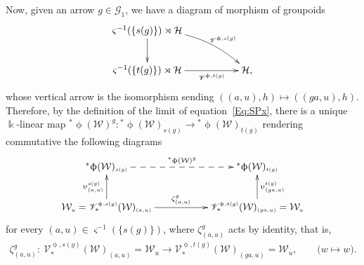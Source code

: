 \documentclass[11pt]{article}
\numberwithin{equation}{section}
\newcommand{\Ga}{\cG_{\Sscript{1}}}
\newcommand{\vV}{\mathscr{V}}
\newcommand{\cG}{{\mathcal G}}
\newcommand{\cH}{{\mathcal H}}
\newcommand{\cW}{{\mathcal W}}
\newcommand{\Sscript}[1]{\scriptscriptstyle{#1}}
\newcommand{\pls}{{}^{*}\upphi}
\begin{document}
Now, given an arrow $g \in \Ga$, we have a diagram of morphism of groupoids
\begin{gather*}
\xymatrix{ \varsigma^{-1}(\{s(g)\}) \rJoin \cH \ar@{->}^-{}[d]
\ar@{->}@/^1pc/^-{\vV^{\Sscript{\upphi, s(g)}}}[drr] & & \\
\varsigma^{-1}(\{t(g)\}) \rJoin \cH \ar@{->}_-{\vV^{\Sscript{\upphi, t(g)}}}[rr] & & \cH, }
\end{gather*}
whose vertical arrow is the isomorphism sending $((a,u), h) \mapsto ( (ga,u),h)$. Therefore, by the definition of the limit of equation~\eqref{Eq:SPx}, there is a unique $\Bbbk$-linear map
${}^*\upphi(\cW)^{\Sscript{g}}\colon {}^*\upphi(\cW)_{\Sscript{s(g)}} \to {}^*\upphi(\cW)_{\Sscript{t(g)}}$ rendering commutative the following diagrams
\begin{gather}\label{Eq:lphiup}
\begin{gathered}
\xymatrix@R=25pt{ \pls(\cW)_{\Sscript{s(g)}}
\ar@{-->}^-{\pls(\cW)^g}[rr] & & \pls(\cW)_{\Sscript{t(g)}} \\
\cW_{\Sscript{u}}=\vV^{\Sscript{\upphi,
s(g)}}_*(\cW)_{\Sscript{(a, u)}}
\ar@{->}^-{\upupsilon^{\Sscript{s(g)}}_{\Sscript{(a, u)}}}[u]
\ar@{->}^-{\zeta^g_{(a, u)}}[rr] & &
\ar@{->}_-{\upupsilon^{\Sscript{t(g)}}_{\Sscript{(ga, u)}}}[u]
\vV^{\Sscript{\upphi, t(g)}}_*(\cW)_{\Sscript{(ga, u)}}
=\cW_{\Sscript{u}} }
\end{gathered}
\end{gather}
for every $(a,u) \in \varsigma^{-1}(\{s(g)\})$, where $\zeta^g_{(a, u)}$ acts by identity, that is,
\begin{gather*}
\zeta^g_{(a, u)}\colon \ \vV^{\Sscript{\upphi, s(g)}}_*(\cW)_{\Sscript{(a, u)}}=\cW_{\Sscript{u}}\longrightarrow \vV^{\Sscript{\upphi,t(g)}}_*(\cW)_{\Sscript{(ga, u)}}=\cW_{\Sscript{u}}, \qquad \big(w \longmapsto w \big).
\end{gather*}
\end{document}
